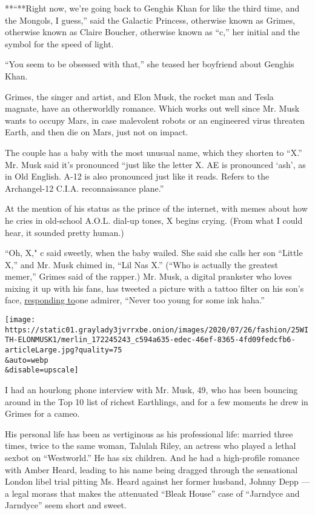 **``**Right now, we're going back to Genghis Khan for like the third
time, and the Mongols, I guess,'' said the Galactic Princess, otherwise
known as Grimes, otherwise known as Claire Boucher, otherwise known as
``c,'' her initial and the symbol for the speed of light.

``You seem to be obsessed with that,'' she teased her boyfriend about
Genghis Khan.

Grimes, the singer and artist, and Elon Musk, the rocket man and Tesla
magnate, have an otherworldly romance. Which works out well since Mr.
Musk wants to occupy Mars, in case malevolent robots or an engineered
virus threaten Earth, and then die on Mars, just not on impact.

The couple has a baby with the most unusual name, which they shorten to
``X.'' Mr. Musk said it's pronounced ``just like the letter X. AE is
pronounced `ash', as in Old English. A-12 is also pronounced just like
it reads. Refers to the Archangel-12 C.I.A. reconnaissance plane.''

At the mention of his status as the prince of the internet, with memes
about how he cries in old-school A.O.L. dial-up tones, X begins crying.
(From what I could hear, it sounded pretty human.)

``Oh, X," c said sweetly, when the baby wailed. She said she calls her
son ``Little X,'' and Mr. Musk chimed in, ``Lil Nas X.'' (``Who is
actually the greatest memer,'' Grimes said of the rapper.) Mr. Musk, a
digital prankster who loves mixing it up with his fans, has tweeted a
picture with a tattoo filter on his son's face,
\href{https://twitter.com/elonmusk/status/1257552183601422337}{responding
to}one admirer, ``Never too young for some ink haha.''

\texttt{[image: https://static01.graylady3jvrrxbe.onion/images/2020/07/26/fashion/25WITH-ELONMUSK1/merlin\_172245243\_c594a635-edec-46ef-8365-4fd09fedcfb6-articleLarge.jpg?quality=75\\\&auto=webp\\\&disable=upscale]}

I had an hourlong phone interview with Mr. Musk, 49, who has been
bouncing around in the Top 10 list of richest Earthlings, and for a few
moments he drew in Grimes for a cameo.

His personal life has been as vertiginous as his professional life:
married three times, twice to the same woman, Talulah Riley, an actress
who played a lethal sexbot on ``Westworld.'' He has six children. And he
had a high-profile romance with Amber Heard, leading to his name being
dragged through the sensational London libel trial pitting Ms. Heard
against her former husband, Johnny Depp --- a legal morass that makes
the attenuated ``Bleak House'' case of ``Jarndyce and Jarndyce'' seem
short and sweet.

